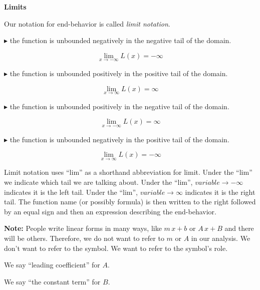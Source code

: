 \documentclass{ximera}
\begin{document}
\begin{notation}  \textbf{\textcolor{red!50!green}{Limits}}

Our notation for end-behavior is called \textit{limit notation}. 



\textbf{\textcolor{red!50!green}{$\blacktriangleright$}} the function is unbounded negatively in the negative tail of the domain.

\[
\lim\limits_{x \to -\infty} L(x) = -\infty
\]


\textbf{\textcolor{red!50!green}{$\blacktriangleright$}} the function is unbounded positively in the positive tail of the domain.

\[
\lim\limits_{x \to \infty} L(x) = \infty
\]


\textbf{\textcolor{red!50!green}{$\blacktriangleright$}} the function is unbounded positively in the negative tail of the domain.

\[
\lim\limits_{x \to -\infty} L(x) = \infty
\]


\textbf{\textcolor{red!50!green}{$\blacktriangleright$}} the function is unbounded negatively in the positive tail of the domain.

\[
\lim\limits_{x \to \infty} L(x) = -\infty
\]




Limit notation uses ``lim'' as a shorthand abbreviation for limit.  Under the ``lim'' we indicate which tail we are talking about.  Under the ``lim'', $variable \to -\infty$ indicates it is the left tail. Under the ``lim'', $variable \to \infty$ indicates it is the right tail.  The function name (or possibly formula) is then written to the right followed by an equal sign and then an expression describing the end-behavior. 




\end{notation}






\textbf{Note:} People write linear forms in many ways, like $m \, x + b$ or $A \, x + B$ and there will be others. Therefore, we do not want to refer to $m$ or $A$ in our analysis. We don't want to refer to the symbol. We want to refer to the symbol's role.

We say ``leading coefficient'' for $A$.


We say ``the constant term'' for $B$.
\end{document}
